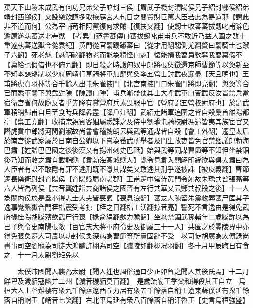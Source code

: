 棄天下山陵未成武有何功兄弟父子並封三侯【謂武子機封渭陽侯兄子紹封鄠侯紹弟靖封西鄉侯】又設樂飲讌多取掖庭宫人旬日之間貲財巨萬大臣若此為是道邪【謂此非不道而何】公為宰輔苟相阿黨復何求賊【復扶又翻】使劔士收蕃蕃拔劔叱甫辭色逾厲遂執蕃送北寺獄　【考異曰范書蕃傳曰蕃拔劔叱甫甫兵不敢近乃益人圍之數十重遂執蕃送獄今從袁紀】黄門從官騶蹋踧蕃曰【從才用翻騶側尤翻賢曰騶騎士也踧子六翻】死老魅【魅明祕翻物老而能為精怪曰魅】復能損我曹員數奪我曹稟假不【稟給也假借也不俯九翻】即日殺之時護匈奴中郎將張奐徵還京師曹節等以奐新至不知本謀矯制以少府周靖行車騎將軍加節與奐率五營士討武夜漏盡【天且明也】王甫將虎賁羽林等合千餘人出屯朱雀掖門【北宫南掖門曰朱雀門將即亮翻】與奐等合已而悉軍闕下與武對陳【陳讀曰陣】甫兵漸盛使其士大呼武軍曰竇武反汝皆禁兵當宿衛宫省何故隨反者乎先降有賞營府兵素畏服中官【營府謂五營校尉府也】於是武軍稍稍歸甫自旦至食時兵降畧盡【降戶江翻】武紹走諸軍追圍之皆自殺梟首雒陽都亭【梟工堯翻】收捕宗親賓客姻屬悉誅之及侍中劉瑜屯騎校尉馮述皆夷其族宦官又譖虎賁中郎將河間劉淑故尚書會稽魏朗云與武等通謀皆自殺【會工外翻】遷皇太后於南宫徙武家屬於日南自公卿以下嘗為蕃武所舉者及門生故吏皆免官禁錮議郎勃海巴肅【姓譜巴巴國之後後漢又有揚州刺史巴祗】始與武等同謀曹節等不知但坐禁錮後乃知而收之肅自載詣縣【肅勃海高城縣人】縣令見肅入閤解印綬欲與俱去肅曰為人臣者有謀不敢隱有罪不逃刑既不隱其謀矣又敢逃其刑乎遂被誅【被皮義翻】曹節遷長樂衛尉封育陽侯【育陽縣屬南陽郡】王甫遷中常侍黄門令如故朱瑀共普張亮等六人皆為列侯【共音龔姓譜共商諸侯之國晉有左行共華乂云鄭共叔段之後】十一人為關内侯於是羣小得志士大夫皆喪氣【喪息浪翻】蕃友人陳留朱震收葬蕃尸匿其子逸事覺繫獄合門桎梏震受考掠【桎之日翻梏工沃翻掠音亮】誓死不言逸由是得免武府掾桂陽胡騰殯歛武尸行喪【掾俞絹翻歛力贍翻】坐以禁錮武孫輔年二歲騰詐以為已子與令史南陽張敞【百官志大將軍府令史及御屬三十一人】共匿之於零陵界中亦得免張奐遷大司農以功封侯奐深病為曹節等所賣固辭不受　以司徒胡廣為太傅録尚書事司空劉寵為司徒大鴻臚許栩為司空【臚陵如翻栩况羽翻】冬十月甲辰晦日有食之　十一月太尉劉矩免以

　　太僕沛國聞人襲為太尉【聞人姓也風俗通曰少正卯魯之聞人其後氏焉】十二月鮮卑及濊貊寇幽并二州【濊音穢貊莫百翻】　是歲疏勒王季父和得殺其王自立　烏桓大人上谷難樓有衆九千餘落遼西丘力居有衆五千餘落自稱王遼東蘇僕延有衆千餘落自稱峭王【峭音七笑翻】右北平烏延有衆八百餘落自稱汗魯王【史言烏桓強盛】

